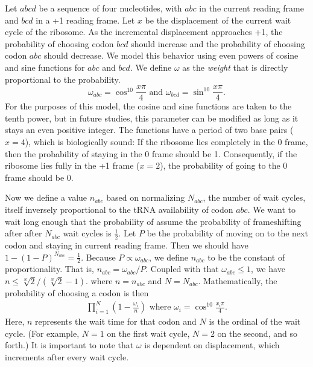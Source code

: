 \documentclass[12pt, draft]{article}
\numberwithin{equation}{section}
\begin{document}
Let $abcd$ be a sequence of four nucleotides, with $abc$ in the
current reading frame and $bcd$ in a +1 reading frame.  Let $x$ be the
displacement of the current wait cycle of the ribosome.  As the
incremental displacement approaches +1, the probability of choosing
codon $bcd$ should increase and the probability of choosing codon
$abc$ should decrease.  We model this behavior using even powers of
cosine and sine functions for $abc$ and $bcd$.  We
define $\omega$ as the \emph{weight} that is directly proportional to
the probability.
\begin{equation}
  \omega_{abc} = \cos^{10}{\frac{x\pi}{4}} \text{ and } \omega_{bcd} = \sin^{10}{\frac{x\pi}{4}}.
\end{equation}
For the purposes of this model, the cosine and sine functions are taken to the tenth power, but
in future studies, this parameter can be modified as long as it stays an even positive integer.
The functions have a period of two base pairs ($x=4$), which is biologically sound:
If the ribosome lies completely in the 0 frame, then the probability of staying in the 0 frame should be 1.  
Consequently, if the ribosome lies fully in the +1 frame ($x=2$), the probability of going to
the 0 frame should be 0.


Now we define a value $n_{abc}$ based on normalizing $N_{abc}$, the
number of wait cycles, itself inversely proportional to the
tRNA availability of codon $abc$.
We want to wait long enough that the probability of assume the probability of frameshifting after
after $N_{abc}$ wait cycles is $\frac{1}{2}$.  Let $P$ be the
probability of moving on to the next codon and staying in current reading
frame.  Then we should have $1-\left(1-P\right)^{N_{abc}} =
\frac{1}{2}$.  Because $P \propto \omega_{abc}$, we define $n_{abc}$ to be the constant of
proportionality. That is, $n_{abc} = \omega_{abc} / P$.  Coupled
with that $\omega_{abc} \le 1$, we have $n \le \sqrt[N]{2}/(\sqrt[N]{2} - 1).$
where $n = n_{abc}$ and $N = N_{abc}$. Mathematically, the probability of choosing a codon is then
\begin{align}
  \prod_{i=1}^N \left(1-\frac{\omega_i}{n}\right) \text{ where } \omega_i = \cos^{10}{\frac{x_i\pi}{4}}.
\end{align}
Here, $n$ represents the wait time for that codon and $N$ is the ordinal of the wait cycle. (For example,
$N=1$ on the first wait cycle, $N=2$ on the second, and so forth.)
It is important to note that $\omega$ is dependent on displacement, 
which increments after every wait cycle.
\end{document}
